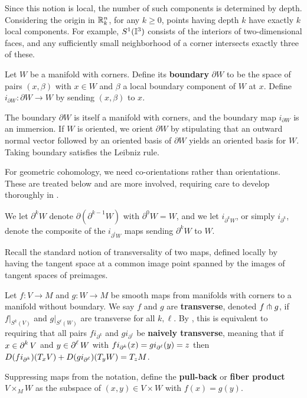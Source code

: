 Since this notion is local, the number of such components is determined by depth.
Considering the origin in $\mathbb{R}^n_k$, for any $k \geq 0$, points having depth $k$ have exactly $k$ local components.
For example, $S^1(\mathbb{I}^3)$ consists of the interiors of two-dimensional faces, and any sufficiently small neighborhood of a corner intersects exactly three of these.

\begin{definition}
	Let $W$ be a manifold with corners. Define its {\bf boundary} $\partial W$ to be the space of pairs $(x, \beta)$ with $x \in W$ and $\beta$ a local boundary component of $W$ at $x$.
	Define $i_{\partial W} \colon \partial W \to W$ by sending $(x,\beta)$ to $x$.
\end{definition}

The boundary $\partial W$ is itself a manifold with corners, and the boundary map $i_{\partial W}$ is an immersion.
If $W$ is oriented, we orient $\partial W$ by stipulating that an outward normal vector followed by an oriented basis of $\partial W$ yields an oriented basis for $W$.
Taking boundary satisfies the Leibniz rule.

For geometric cohomology, we need co-orientations rather than orientations.
These are treated below and are more involved, requiring care to develop thoroughly in \cite[Section 3]{medina2022foundations}.

We let $\partial^k W$ denote $\partial (\partial^{k-1} W)$ with $\partial^0 W = W$, and we let $i_{\partial^k W}$, or simply $i_{\partial^k}$, denote the composite of the $i_{\partial^i W}$ maps sending $\partial^k W$ to $W$.

Recall the standard notion of transversality of two maps, defined locally by having the tangent space at a common image point spanned by the images of tangent spaces of preimages.

\begin{definition}
	Let $f \colon V \to M$ and $g \colon W \to M$ be smooth maps from manifolds with corners to a manifold without boundary.
	We say $f$ and $g$ are \textbf{transverse}, denoted $f \pitchfork g$, if $f|_{S^k(V)}$ and $g|_{S^\ell(W)}$ are transverse for all $k, \ell$.
	By \cite[Lemma 2.15]{medina2022foundations}, this is equivalent to requiring that all pairs $fi_{\partial^k}$ and $gi_{\partial^\ell}$ be \textbf{naively transverse}, meaning that if $x \in \operatorname{\partial}^k V$ and $y\in \operatorname{\partial}^\ell W$ with $fi_{\operatorname{\partial}^k}(x) = g i_{\operatorname{\partial}^\ell} (y) = z$ then $D(fi_{\operatorname{\partial}^k})(T_x V)+D(g i_{\operatorname{\partial}^\ell})(T_y W) = T_z M$.

	Suppressing maps from the notation, define the \textbf{pull-back} or \textbf{fiber product} $V \times_M W$ as the subspace of $(x, y) \in V \times W$ with $f(x) = g(y)$.
\end{definition}

